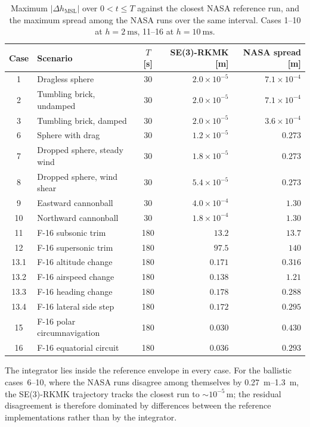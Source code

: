 \documentclass[a4paper,10pt]{article}
\theoremstyle{definition}
\begin{document}
\begin{table}[h]
  \centering
  \caption{Maximum $\lvert\Delta h_{\mathrm{MSL}}\rvert$ over $0 < t \leq T$
    against the closest NASA reference run, and the maximum spread among the
    NASA runs over the same interval.  Cases 1--10 at
    $h = \SI{2}{\milli\second}$, 11--16 at $h = \SI{10}{\milli\second}$.}
  \label{tab:validation_summary}
  \small
  \begin{tabular}{clcrr}
    \toprule
    Case & Scenario & $T$ [s] & SE(3)-RKMK [m] & NASA spread [m] \\
    \midrule
     1 & Dragless sphere             & 30  & $2.0\times10^{-5}$ & $7.1\times10^{-4}$ \\
     2 & Tumbling brick, undamped    & 30  & $2.0\times10^{-5}$ & $7.1\times10^{-4}$ \\
     3 & Tumbling brick, damped      & 30  & $2.0\times10^{-5}$ & $3.6\times10^{-4}$ \\
     6 & Sphere with drag            & 30  & $1.2\times10^{-5}$ & $0.273$ \\
     7 & Dropped sphere, steady wind & 30  & $1.8\times10^{-5}$ & $0.273$ \\
     8 & Dropped sphere, wind shear  & 30  & $5.4\times10^{-5}$ & $0.273$ \\
     9 & Eastward cannonball         & 30  & $4.0\times10^{-4}$ & $1.30$ \\
    10 & Northward cannonball        & 30  & $1.8\times10^{-4}$ & $1.30$ \\
    11 & F-16 subsonic trim          & 180 & $13.2$  & $13.7$  \\
    12 & F-16 supersonic trim        & 180 & $97.5$  & $140$   \\
    13.1 & F-16 altitude change      & 180 & $0.171$ & $0.316$ \\
    13.2 & F-16 airspeed change      & 180 & $0.138$ & $1.21$  \\
    13.3 & F-16 heading change       & 180 & $0.178$ & $0.288$ \\
    13.4 & F-16 lateral side step    & 180 & $0.172$ & $0.295$ \\
    15 & F-16 polar circumnavigation & 180 & $0.030$ & $0.430$ \\
    16 & F-16 equatorial circuit     & 180 & $0.036$ & $0.293$ \\
    \bottomrule
  \end{tabular}
\end{table}

The integrator lies inside the reference envelope in every case.  For the
ballistic cases~6--10, where the NASA runs disagree among themselves by
\SIrange{0.27}{1.3}{\metre}, the SE(3)-RKMK trajectory tracks the closest run
to $\sim\!10^{-5}\,\si{\metre}$; the residual disagreement is therefore
dominated by differences between the reference implementations rather than by
the integrator.
\end{document}
